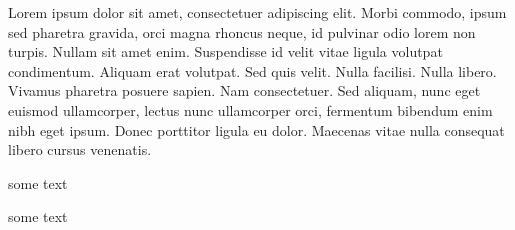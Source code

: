 \documentclass{scrbook}%
\begin{document}
\beginnumbering

\pstart
{}
\pend
\pstart
{}
\pend
\pstart
Lorem ipsum dolor sit amet, consectetuer adipiscing elit. Morbi commodo, ipsum sed pharetra gravida, orci magna rhoncus neque, id pulvinar odio lorem non turpis. Nullam sit amet enim. Suspendisse id velit vitae ligula volutpat condimentum. Aliquam erat volutpat. Sed quis velit. Nulla facilisi. Nulla libero. Vivamus pharetra posuere sapien. Nam consectetuer. Sed aliquam, nunc eget euismod ullamcorper, lectus nunc ullamcorper orci, fermentum bibendum enim nibh eget ipsum. Donec porttitor ligula eu dolor. Maecenas vitae nulla consequat libero cursus venenatis.

\pend

\pstart
{}
\pend
\pstart
{}
\pend
\pstart
some text
\pend

\pstart
{}
\pend
\pstart
{}
\pend
\pstart
some text
\pend

\endnumbering
\end{document}
